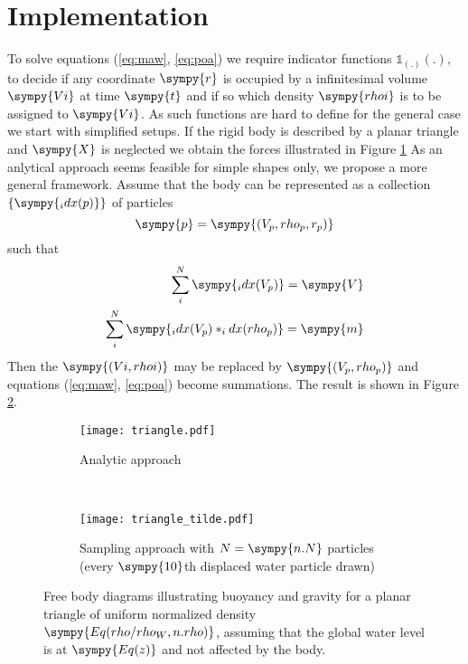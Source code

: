 \documentclass[12pt,a4paper]{article}
\newcommand{\s}{\sympy}
\begin{document}
\section{Implementation}
To solve equations (\ref{eq:maw}, \ref{eq:poa}) we require indicator functions $\mathds{1}_{(.)}(.)$, to decide if any coordinate $\s{r}$ is occupied by a infinitesimal volume $\s{Vi}$ at time $\s{t}$ and if so which density $\s{rhoi}$ is to be assigned to $\s{Vi}$.
As such functions are hard to define for the general case we start with simplified setups.  
If the rigid body is described by a planar triangle and $\s{X}$ is neglected we obtain the forces illustrated in Figure \ref{fg:fbda}
As an anlytical approach seems feasible for simple shapes only, we propose a more general framework.
Assume that the body can be represented as a collection $\{\s{_idx(p)}\}$ of particles
\begin{equation*}
	\s{p} = \s{(V_p, rho_p, r_p)}	
\end{equation*}
such that
\begin{equation*}
	\begin{split}
\sum\limits_i^N \s{_idx(V_p)} = \s{V} \\ 
\sum\limits_i^N \s{_idx(V_p) * _idx(rho_p)} = \s{m}
\end{split}
\end{equation*}
Then the $\s{(Vi, rhoi)}$ may be replaced by $\s{(V_p, rho_p)}$ and equations (\ref{eq:maw}, \ref{eq:poa}) become summations.
The result is shown in Figure \ref{fg:fbdb}.  
\begin{figure}
\centering
\begin{subfigure}[t]{0.4\textwidth}
\texttt{[image: triangle.pdf]}
\caption{Analytic approach}
\label{fg:fbda}
\end{subfigure}
~
\begin{subfigure}[t]{0.4\textwidth}
\texttt{[image: triangle\_tilde.pdf]}
\caption{Sampling approach with $N = \s{n.N}$ particles (every $\s{10}$th displaced water particle drawn)}
\label{fg:fbdb}
\end{subfigure}
\caption{Free body diagrams illustrating buoyancy and gravity for a planar triangle of uniform normalized density $\s{Eq(rho/rho_W, n.rho)}$, assuming that the global water level is at $\s{Eq(z)}$ and not affected by the body.}
\label{fg:fbd}
\end{figure}
\end{document}
